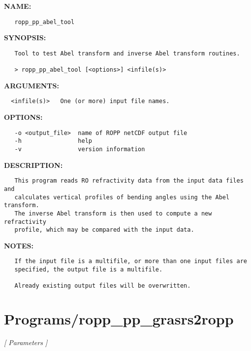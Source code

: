 \label{ch:robo87}
\label{ch:Programs_ropp_pp_abel_tool}
\textbf{NAME:}\hspace{0.08in}\begin{Verbatim}
   ropp_pp_abel_tool
\end{Verbatim}
\textbf{SYNOPSIS:}\hspace{0.08in}\begin{Verbatim}
   Tool to test Abel transform and inverse Abel transform routines.

   > ropp_pp_abel_tool [<options>] <infile(s)>
\end{Verbatim}
\textbf{ARGUMENTS:}\hspace{0.08in}\begin{Verbatim}
  <infile(s)>   One (or more) input file names.
\end{Verbatim}
\textbf{OPTIONS:}\hspace{0.08in}\begin{Verbatim}
   -o <output_file>  name of ROPP netCDF output file
   -h                help
   -v                version information
\end{Verbatim}
\textbf{DESCRIPTION:}\hspace{0.08in}\begin{Verbatim}
   This program reads RO refractivity data from the input data files and 
   calculates vertical profiles of bending angles using the Abel transform. 
   The inverse Abel transform is then used to compute a new refractivity 
   profile, which may be compared with the input data.
\end{Verbatim}
\textbf{NOTES:}\hspace{0.08in}\begin{Verbatim}
   If the input file is a multifile, or more than one input files are
   specified, the output file is a multifile.

   Already existing output files will be overwritten.
\end{Verbatim}
\section{Programs/ropp\_pp\_grasrs2ropp}
\textsl{[ Parameters ]}

